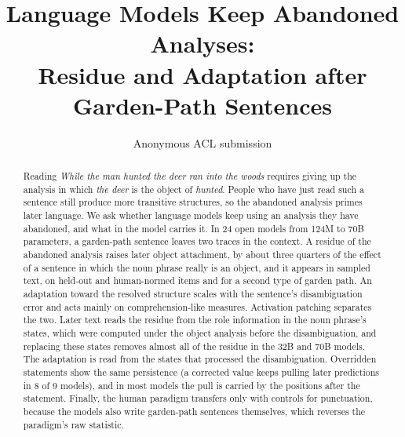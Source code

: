 \documentclass[11pt]{article}
\title{Language Models Keep Abandoned Analyses:\\ Residue and Adaptation after Garden-Path Sentences}
\author{Anonymous ACL submission}
\newcommand{\ex}[1]{\textit{#1}}
\begin{document}
\maketitle

\begin{abstract}
Reading \ex{While the man hunted the deer ran into the woods} requires giving up the analysis in which \ex{the deer} is the object of \ex{hunted}.
People who have just read such a sentence still produce more transitive structures, so the abandoned analysis primes later language.
We ask whether language models keep using an analysis they have abandoned, and what in the model carries it.
In 24 open models from 124M to 70B parameters, a garden-path sentence leaves two traces in the context.
A residue of the abandoned analysis raises later object attachment, by about three quarters of the effect of a sentence in which the noun phrase really is an object, and it appears in sampled text, on held-out and human-normed items and for a second type of garden path.
An adaptation toward the resolved structure scales with the sentence's disambiguation error and acts mainly on comprehension-like measures.
Activation patching separates the two.
Later text reads the residue from the role information in the noun phrase's states, which were computed under the object analysis before the disambiguation, and replacing these states removes almost all of the residue in the 32B and 70B models.
The adaptation is read from the states that processed the disambiguation.
Overridden statements show the same persistence (a corrected value keeps pulling later predictions in 8 of 9 models), and in most models the pull is carried by the positions after the statement.
Finally, the human paradigm transfers only with controls for punctuation, because the models also write garden-path sentences themselves, which reverses the paradigm's raw statistic.
\end{abstract}
\end{document}
